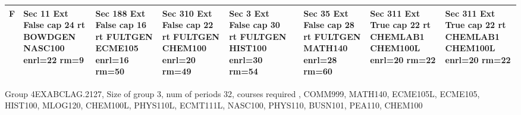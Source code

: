 \documentclass{article} \usepackage[margin=0.5in]{geometry}
\newcommand{\textgr}[1]{\cellcolor{gray!40}\textbf{#1}}
\begin{document}
\begin{tabular}{|c|z|z|z|z|z|z|z|z|}
\hline
\textgr{F} &  Sec 11 Ext False cap 24 rt BOWDGEN NASC100 enrl=22 rm=9 & Sec 188 Ext False cap 16 rt FULTGEN ECME105 enrl=16 rm=50 & Sec 310 Ext False cap 22 rt FULTGEN CHEM100 enrl=20 rm=49 & Sec 3 Ext False cap 30 rt FULTGEN HIST100 enrl=30 rm=54 &  & Sec 35 Ext False cap 28 rt FULTGEN MATH140 enrl=28 rm=60 & Sec 311 Ext True cap 22 rt CHEMLAB1 CHEM100L enrl=20 rm=22 & Sec 311 Ext True cap 22 rt CHEMLAB1 CHEM100L enrl=20 rm=22 \\[65pt]
\hline
\end{tabular}

	
Group 4EXABCLAG.2127, Size of group  3, num of periods 32, courses required , COMM999, MATH140, ECME105L, ECME105, HIST100, MLOG120, CHEM100L, PHYS110L, ECMT111L, NASC100, PHYS110, BUSN101, PEA110, CHEM100 
\newpage
	
\end{document}
